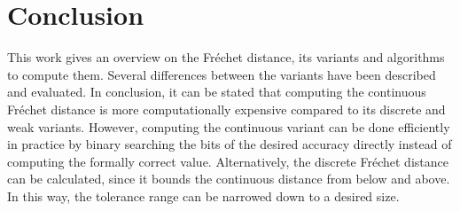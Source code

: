 \documentclass[
oneside,
fontsize=11pt
]{scrartcl}
\begin{document}
\section{Conclusion}
This work gives an overview on the Fréchet distance, 
its variants and algorithms to compute them. 
Several differences between the variants have been described 
and evaluated. 
In conclusion, it can be stated that computing the continuous 
Fréchet distance is more computationally expensive compared 
to its discrete and weak variants.
However, computing the continuous variant can be done efficiently
in practice by binary searching the bits of the desired accuracy directly
instead of computing the formally correct value. 
Alternatively, the discrete Fréchet distance can be calculated, 
since it bounds the continuous distance 
from below and above. 
In this way, the tolerance range can be narrowed down to a desired size.





\newpage
\appendix  %




\end{document}
